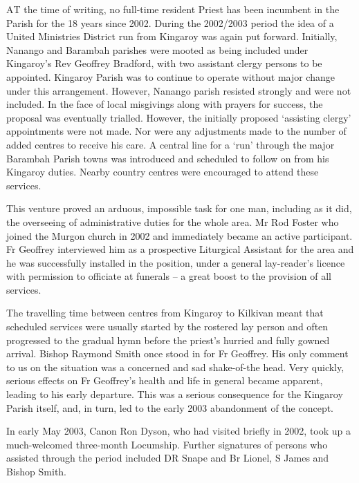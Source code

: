 \lettrine[lines=3]{A}{T}
 the time of writing, no full-time resident Priest has been incumbent in the Parish for the 18 years since 2002. During the 2002/2003 period the idea of a United Ministries District run from Kingaroy was again put forward. Initially, Nanango and Barambah parishes were mooted as being included under Kingaroy's Rev Geoffrey Bradford, with two assistant clergy persons to be appointed. Kingaroy Parish was to continue to operate without major change under this arrangement. However, Nanango parish resisted strongly and were not included. In the face of local misgivings along with prayers for success, the proposal was eventually trialled. However, the initially proposed `assisting clergy' appointments were not made. Nor were any adjustments made to the number of added centres to receive his care. A central line for a `run' through the major Barambah Parish towns was introduced and scheduled to follow on from his Kingaroy duties. Nearby country centres were encouraged to attend these services.

This venture proved an arduous, impossible task for one man, including as it did, the overseeing of administrative duties for the whole area. Mr Rod Foster who joined the Murgon church in 2002 and immediately became an active participant. Fr Geoffrey interviewed him as a prospective Liturgical Assistant for the area and he was successfully installed in the position, under a general lay-reader's licence with permission to officiate at funerals -- a great boost to the provision of all services.



The travelling time between centres from Kingaroy to Kilkivan meant that scheduled services were usually started by the rostered lay person and often progressed to the gradual hymn before the priest's hurried and fully gowned arrival. Bishop Raymond Smith once stood in for Fr Geoffrey. His only comment to us on the situation was a concerned and sad shake-of-the head. Very quickly, serious effects on Fr Geoffrey's health and life in general became apparent, leading to his early departure. This was a serious consequence for the Kingaroy Parish itself, and, in turn, led to the early 2003 abandonment of the concept.



In early May 2003, Canon Ron Dyson, who had visited briefly in 2002, took up a much-welcomed three-month Locumship. Further signatures of persons who assisted through the period included DR Snape and Br Lionel, S James and Bishop Smith.



